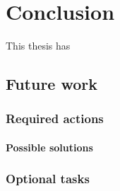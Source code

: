\chapter{Conclusion}
\label{chp:conclusion} 
This thesis has
\section{Future work}
\label{sec:futurework} 


\subsection{Required actions}

\subsubsection{Possible solutions}

\subsection{Optional tasks}

